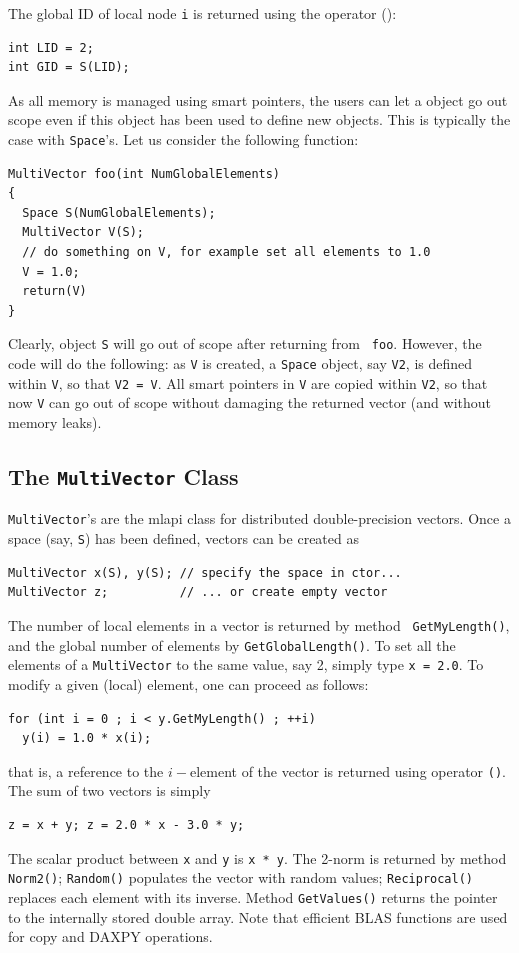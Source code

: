\documentclass{article}[11pt]
\newcommand{\MLAPI}  {{\sc mlapi }}
\begin{document}
The global ID of local node {\tt i} is returned using the operator ():
\begin{verbatim}
int LID = 2;
int GID = S(LID);
\end{verbatim}

\smallskip

As all memory is managed using smart pointers, the users can let a object go
out scope even if this object has been used to define new objects. This is
typically the case with {\tt Space}'s. Let us consider the following function:
\begin{verbatim}
MultiVector foo(int NumGlobalElements)
{
  Space S(NumGlobalElements);
  MultiVector V(S);
  // do something on V, for example set all elements to 1.0
  V = 1.0;
  return(V)
}
\end{verbatim}
Clearly, object {\tt S} will go out of scope after returning from {\tt
  foo}. However, the code will do the following:
as {\tt V} is created, a {\tt Space} object, say {\tt V2}, is defined
within {\tt V}, so that {\tt V2 = V}. All smart pointers in {\tt V} are copied
within {\tt V2}, so that now {\tt V} can go out of scope without damaging the
returned vector (and without memory leaks).

\subsection{The {\tt MultiVector} Class}
\label{sec:multivector}

{\tt MultiVector}'s are the \MLAPI class for distributed double-precision
vectors. Once a space (say, {\tt S}) has been defined, vectors can be created
as
\begin{verbatim}
MultiVector x(S), y(S); // specify the space in ctor...
MultiVector z;          // ... or create empty vector
\end{verbatim}

The number of local elements in a vector is returned by method {\tt
  GetMyLength()}, and the global number of elements by
{\tt GetGlobalLength()}. To set all the elements of a {\tt MultiVector} to the same value, say 2, simply type {\tt x = 2.0}. To modify a given (local) element, one can proceed as follows:
\begin{verbatim}
for (int i = 0 ; i < y.GetMyLength() ; ++i)
  y(i) = 1.0 * x(i);
\end{verbatim}
that is, a reference to the $i-$element of the vector is returned using
operator \verb!()!.  The sum of two vectors is simply
\begin{verbatim}
z = x + y; z = 2.0 * x - 3.0 * y; 
\end{verbatim}
The scalar product between {\tt x} and {\tt y} is {\tt x * y}. The 2-norm is
returned by method {\tt Norm2()}; {\tt Random()} populates the vector with
random values; {\tt Reciprocal()} replaces each element with its inverse. 
Method {\tt GetValues()} returns the pointer to the internally stored double
array. Note
that efficient BLAS functions are used for copy and DAXPY operations. 
\end{document}
